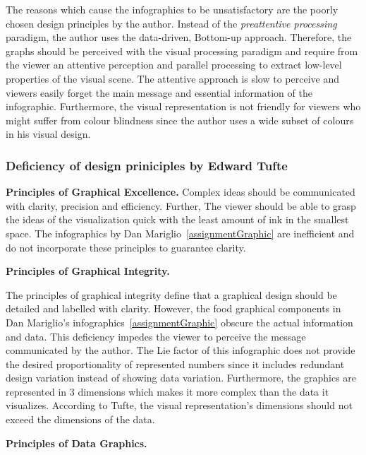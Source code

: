 The reasons which cause the infographics to be unsatisfactory are the poorly
chosen design principles by the author. Instead of the \textit{preattentive
processing} paradigm, the author uses the data-driven, Bottom-up approach.
Therefore, the graphs should be perceived with the visual processing paradigm
and require from the viewer an attentive perception and parallel processing to
extract low-level properties of the visual scene. The attentive approach is slow
to perceive and viewers easily forget the main message and essential information
of the infographic. Furthermore, the visual representation is not friendly for
viewers who might suffer from colour blindness since the author uses a wide
subset of colours in his visual design.

\subsubsection{Deficiency of design priniciples by Edward Tufte}

\textbf{Principles of Graphical Excellence.} Complex ideas should be
communicated with clarity, precision and efficiency. Further, The viewer should
be able to grasp the ideas of the visualization quick with the least amount of
ink in the smallest space. The infographics by Dan
Mariglio~\ref{assignmentGraphic} are inefficient and do not incorporate these
principles to guarantee clarity.

\textbf{Principles of Graphical Integrity.}

The principles of graphical integrity define that a graphical design should be
detailed and labelled with clarity. However, the food graphical components in Dan
Mariglio's infographics~\ref{assignmentGraphic} obscure the actual information
and data. This deficiency impedes the viewer to perceive the message
communicated by the author. The Lie factor of this infographic does not provide
the desired proportionality of represented numbers since it includes redundant
design variation instead of showing data variation. Furthermore, the graphics
are represented in 3 dimensions which makes it more complex than the data it
visualizes. According to Tufte, the visual representation's dimensions should
not exceed the dimensions of the data. 

\textbf{Principles of Data Graphics.}


